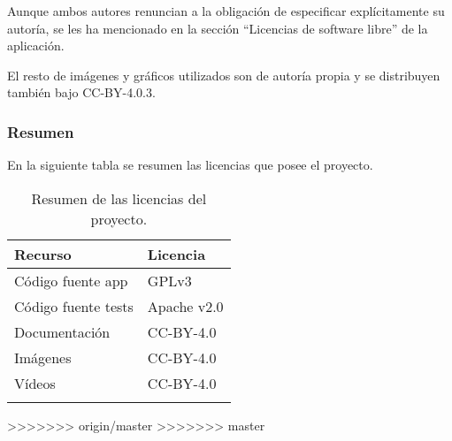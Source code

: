 Aunque ambos autores renuncian a la obligación de especificar
explícitamente su autoría, se les ha mencionado en la sección
``Licencias de software libre'' de la aplicación.

El resto de imágenes y gráficos utilizados son de autoría propia y se
distribuyen también bajo CC-BY-4.0.3.

\subsubsection{Resumen}\label{resumen-1}

En la siguiente tabla se resumen las licencias que posee el proyecto.

\begin{longtable}[]{@{}ll@{}}
\toprule
\begin{minipage}[b]{0.31\columnwidth}\raggedright\strut
Recurso\strut
\end{minipage} & \begin{minipage}[b]{0.21\columnwidth}\raggedright\strut
Licencia\strut
\end{minipage}\tabularnewline
\midrule
\endhead
\begin{minipage}[t]{0.31\columnwidth}\raggedright\strut
Código fuente app\strut
\end{minipage} & \begin{minipage}[t]{0.21\columnwidth}\raggedright\strut
GPLv3\strut
\end{minipage}\tabularnewline
\begin{minipage}[t]{0.31\columnwidth}\raggedright\strut
Código fuente tests\strut
\end{minipage} & \begin{minipage}[t]{0.21\columnwidth}\raggedright\strut
Apache v2.0\strut
\end{minipage}\tabularnewline
\begin{minipage}[t]{0.31\columnwidth}\raggedright\strut
Documentación\strut
\end{minipage} & \begin{minipage}[t]{0.21\columnwidth}\raggedright\strut
CC-BY-4.0\strut
\end{minipage}\tabularnewline
\begin{minipage}[t]{0.31\columnwidth}\raggedright\strut
Imágenes\strut
\end{minipage} & \begin{minipage}[t]{0.21\columnwidth}\raggedright\strut
CC-BY-4.0\strut
\end{minipage}\tabularnewline
\begin{minipage}[t]{0.31\columnwidth}\raggedright\strut
Vídeos\strut
\end{minipage} & \begin{minipage}[t]{0.21\columnwidth}\raggedright\strut
CC-BY-4.0\strut
\end{minipage}\tabularnewline
\bottomrule
\caption{Resumen de las licencias del proyecto.}
\end{longtable}
>>>>>>> origin/master
>>>>>>> master
